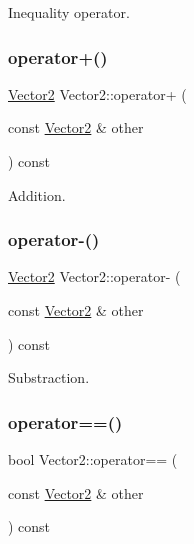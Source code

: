 Inequality operator. 

\mbox{\label{struct_vector2_a53bdaa4ea8e1504f8a78ac78e6f151bf}} 
\subsubsection{\texorpdfstring{operator+()}{operator+()}}
{\footnotesize\ttfamily \mbox{\hyperlink{struct_vector2}{Vector2}} Vector2\+::operator+ (\begin{DoxyParamCaption}\item[{const \mbox{\hyperlink{struct_vector2}{Vector2}} \&}]{other }\end{DoxyParamCaption}) const}



Addition. 

\mbox{\label{struct_vector2_a9f6650ee1529209532c14fc0e4e97a6a}} 
\subsubsection{\texorpdfstring{operator-\/()}{operator-()}}
{\footnotesize\ttfamily \mbox{\hyperlink{struct_vector2}{Vector2}} Vector2\+::operator-\/ (\begin{DoxyParamCaption}\item[{const \mbox{\hyperlink{struct_vector2}{Vector2}} \&}]{other }\end{DoxyParamCaption}) const}



Substraction. 

\mbox{\label{struct_vector2_a75c903883dd1c8c6e39f83b3c0f1c6ab}} 
\subsubsection{\texorpdfstring{operator==()}{operator==()}}
{\footnotesize\ttfamily bool Vector2\+::operator== (\begin{DoxyParamCaption}\item[{const \mbox{\hyperlink{struct_vector2}{Vector2}} \&}]{other }\end{DoxyParamCaption}) const}



